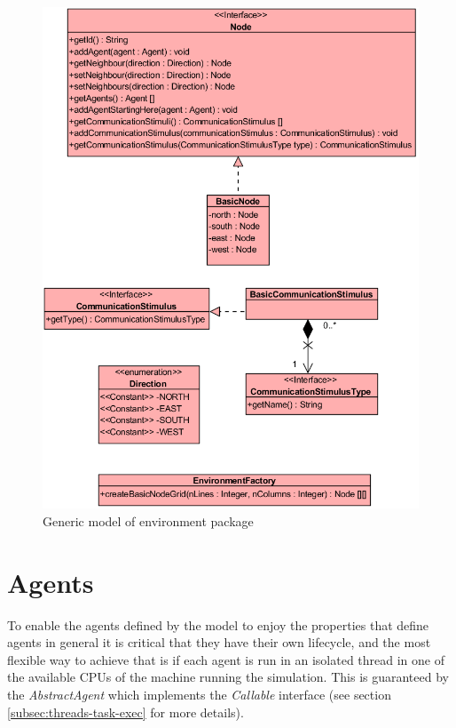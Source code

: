 \begin{figure}[H]
  \centering
  \includegraphics[width=1.0\linewidth]{gfx/uml-env-package.png}
  \caption{Generic model of environment package}
  \label{fig:gen-env-package}
\end{figure}

\section {Agents}
\label{sec:agents}

To enable the agents defined by the model to enjoy the properties that define agents in general it is critical that they have their own lifecycle, and the most flexible way to achieve that is if each agent is run in an isolated thread in one of the available CPUs of the machine running the simulation. This is guaranteed by the \emph{AbstractAgent} which implements the \emph{Callable} interface (see section \ref{subsec:threads-task-exec} for more details).  

